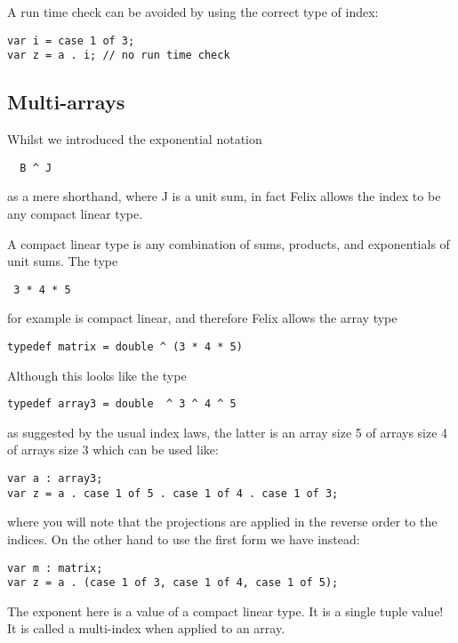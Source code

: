 \documentclass[oneside]{book}
\begin{document}
A run time check can be avoided by using the correct type of index:

\begin{verbatim}
var i = case 1 of 3;
var z = a . i; // no run time check
\end{verbatim}


\subsection{Multi-arrays}
Whilst we introduced the exponential notation

\begin{verbatim}
  B ^ J
\end{verbatim}

as a mere shorthand, where J is a unit sum, in fact Felix allows
the index to be any compact linear type.

A compact linear type is any combination of sums, products,
and exponentials of unit sums. The type

\begin{verbatim}
 3 * 4 * 5
\end{verbatim}

for example is compact linear, and therefore Felix allows the array type

\begin{verbatim}
typedef matrix = double ^ (3 * 4 * 5)
\end{verbatim}

Although this looks like the type

\begin{verbatim}
typedef array3 = double  ^ 3 ^ 4 ^ 5
\end{verbatim}

as suggested by the usual index laws, the latter is an array size 5 of
arrays size 4 of arrays size 3 which can be used like:

\begin{verbatim}
var a : array3;
var z = a . case 1 of 5 . case 1 of 4 . case 1 of 3;
\end{verbatim}

where you will note that the projections are applied in the reverse
order to the indices. On the other hand to use the first form we have
instead:

\begin{verbatim}
var m : matrix;
var z = a . (case 1 of 3, case 1 of 4, case 1 of 5);
\end{verbatim}

The exponent here is a value of a compact linear type.
It is a single tuple value! It is called a multi-index
when applied to an array.
\end{document}
